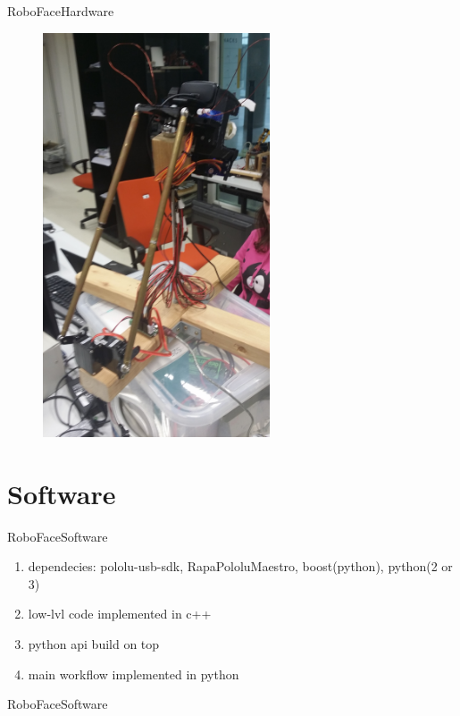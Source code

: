 \documentclass{beamer}
\begin{document}
\begin{frame}{RoboFace}{Hardware}
	\begin{figure}
		\centering
        \includegraphics[width=0.6\textwidth,angle=270]{figures/RoboFaceBack.jpg}
		\label{fig:RoboFaceBack}
	\end{figure}
\end{frame}

\section{Software}
\begin{frame}{RoboFace}{Software}
    \begin{enumerate}
        \item dependecies: pololu-usb-sdk, RapaPololuMaestro, boost(python), python(2 or 3)
        \item low-lvl code implemented in c++
        \item python api build on top
        \item main workflow implemented in python
    \end{enumerate}
\end{frame}

\begin{frame}{RoboFace}{Software}
    \lstServoConfig
\end{frame}
\end{document}
